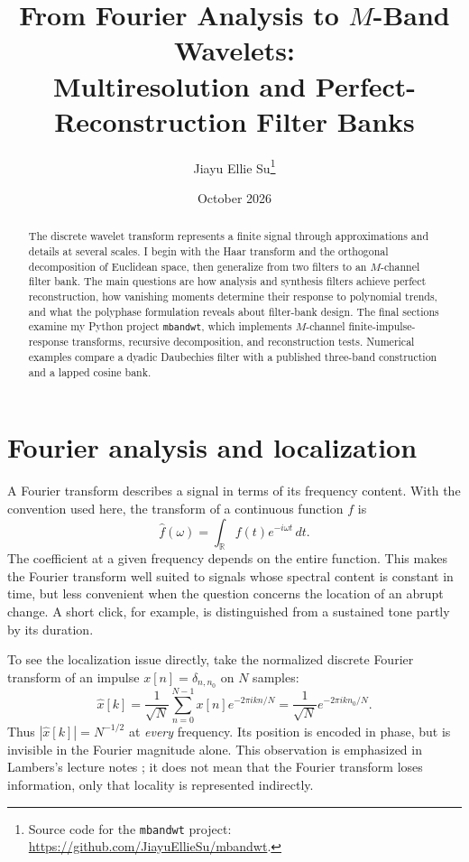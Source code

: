 \documentclass{article}
\title{From Fourier Analysis to $M$-Band Wavelets:\\
Multiresolution and Perfect-Reconstruction Filter Banks}
\author{Jiayu Ellie Su\thanks{Source code for the \texttt{mbandwt} project: \url{https://github.com/JiayuEllieSu/mbandwt}.}}
\date{October 2026}
\theoremstyle{definition}
\theoremstyle{remark}
\newcommand{\R}{\mathbb R}
\newcommand{\abs}[1]{\left\lvert#1\right\rvert}
\begin{document}
\maketitle
\begin{abstract}
The discrete wavelet transform represents a finite signal through approximations and details at several scales. I begin with the Haar transform and the orthogonal decomposition of Euclidean space, then generalize from two filters to an $M$-channel filter bank. The main questions are how analysis and synthesis filters achieve perfect reconstruction, how vanishing moments determine their response to polynomial trends, and what the polyphase formulation reveals about filter-bank design. The final sections examine my Python project \texttt{mbandwt}, which implements $M$-channel finite-impulse-response transforms, recursive decomposition, and reconstruction tests. Numerical examples compare a dyadic Daubechies filter with a published three-band construction and a lapped cosine bank.
\end{abstract}
\tableofcontents

\section{Fourier analysis and localization}
A Fourier transform describes a signal in terms of its frequency content. With the convention used here, the transform of a continuous function $f$ is
\begin{equation}
\widehat f(\omega)=\int_{\R}f(t)e^{-i\omega t}\,dt.
\label{eq:ft}
\end{equation}
The coefficient at a given frequency depends on the entire function. This makes the Fourier transform well suited to signals whose spectral content is constant in time, but less convenient when the question concerns the location of an abrupt change. A short click, for example, is distinguished from a sustained tone partly by its duration.

To see the localization issue directly, take the normalized discrete Fourier transform of an impulse $x[n]=\delta_{n,n_0}$ on $N$ samples:
\begin{equation}
\widehat x[k]=\frac{1}{\sqrt N}\sum_{n=0}^{N-1}x[n]e^{-2\pi i kn/N}
=\frac{1}{\sqrt N}e^{-2\pi i k n_0/N}.
\end{equation}
Thus $\abs{\widehat x[k]}=N^{-1/2}$ at \emph{every} frequency. Its position is encoded in phase, but is invisible in the Fourier magnitude alone. This observation is emphasized in Lambers's lecture notes \cite{lambers2006}; it does not mean that the Fourier transform loses information, only that locality is represented indirectly.
\end{document}

